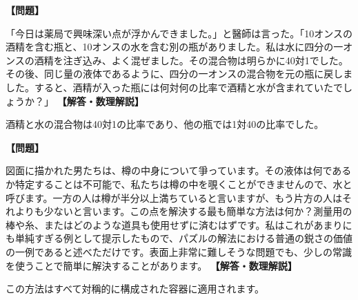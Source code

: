 \documentclass[10pt,a4paper,oneside,openany]{ltjsbook}
\begin{document}
\begin{tcolorbox}[colback=softblue,colframe=primaryblue,title=\textbf{第 363 問：醫師の疑問 （原題: THE DOCTOR'S QUERY.）},arc=2mm,boxrule=1pt,breakable]
\textbf{【問題】}\par\vspace{0.3em}
「今日は薬局で興味深い点が浮かんできました。」と醫師は言った。「10オンスの酒精を含む瓶と、10オンスの水を含む別の瓶がありました。私は水に四分の一オンスの酒精を注ぎ込み、よく混ぜました。その混合物は明らかに40対1でした。その後、同じ量の液体であるように、四分の一オンスの混合物を元の瓶に戻しました。すると、酒精が入った瓶には何対何の比率で酒精と水が含まれていたでしょうか？」
\tcblower
\textbf{【解答・数理解説】}\par\vspace{0.3em}
酒精と水の混合物は40対1の比率であり、他の瓶では1対40の比率でした。
\end{tcolorbox}

\begin{tcolorbox}[colback=softblue,colframe=primaryblue,title=\textbf{第 364 問：樽のパズル （原題: THE BARREL PUZZLE.）},arc=2mm,boxrule=1pt,breakable]
\textbf{【問題】}\par\vspace{0.3em}
図面に描かれた男たちは、樽の中身について爭っています。その液体は何であるか特定することは不可能で、私たちは樽の中を覗くことができませんので、水と呼びます。一方の人は樽が半分以上満ちていると言いますが、もう片方の人はそれよりも少ないと言います。この点を解決する最も簡単な方法は何か？測量用の棒や糸、またはどのような道具も使用せずに済むはずです。私はこれがあまりにも単純すぎる例として提示したもので、パズルの解法における普通の鋭さの価値の一例であると述べただけです。表面上非常に難しそうな問題でも、少しの常識を使うことで簡単に解決することがあります。
\tcblower
\textbf{【解答・数理解説】}\par\vspace{0.3em}
この方法はすべて対稱的に構成された容器に適用されます。
\end{tcolorbox}
\end{document}
